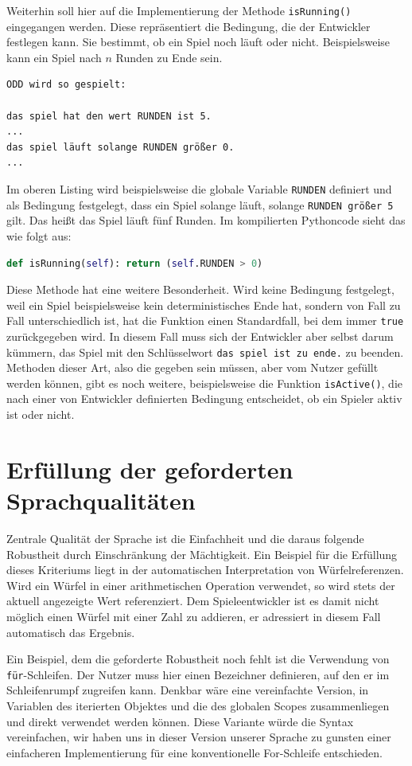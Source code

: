 Weiterhin soll hier auf die Implementierung der Methode \texttt{isRunning()} eingegangen werden. Diese repräsentiert die Bedingung, die der Entwickler festlegen kann. Sie bestimmt, ob ein Spiel noch läuft oder nicht. Beispielsweise kann ein Spiel nach $n$ Runden zu Ende sein.

\begin{lstlisting}[label={lst:ODD}]
ODD wird so gespielt:

das spiel hat den wert RUNDEN ist 5.
...
das spiel läuft solange RUNDEN größer 0.
...
\end{lstlisting}
	Im oberen Listing wird beispielsweise die globale Variable \texttt{RUNDEN} definiert und als Bedingung festgelegt, dass ein Spiel solange läuft, solange \texttt{RUNDEN größer 5} gilt. Das heißt das Spiel läuft fünf Runden. Im kompilierten Pythoncode sieht das wie folgt aus:
\begin{lstlisting}[language=Python]
def isRunning(self): return (self.RUNDEN > 0)
\end{lstlisting}
Diese Methode hat eine weitere Besonderheit. Wird keine Bedingung festgelegt, weil ein Spiel beispielsweise kein deterministisches Ende hat, sondern von Fall zu Fall unterschiedlich ist, hat die Funktion einen Standardfall, bei dem immer \texttt{true} zurückgegeben wird. In diesem Fall muss sich der Entwickler aber selbst darum kümmern, das Spiel mit den Schlüsselwort \texttt{das spiel ist zu ende.} zu beenden. Methoden dieser Art, also die gegeben sein müssen, aber vom Nutzer gefüllt werden können, gibt es noch weitere, beispielsweise die Funktion \texttt{isActive()}, die nach einer von Entwickler definierten Bedingung entscheidet, ob ein Spieler aktiv ist oder nicht.


\section{Erfüllung der geforderten Sprachqualitäten} %
\label{sec:erfullung_der_geforderten_sprachqualitaten}
Zentrale Qualität der Sprache ist die Einfachheit und die daraus folgende Robustheit durch Einschränkung der Mächtigkeit. Ein Beispiel für die Erfüllung dieses Kriteriums liegt in der automatischen Interpretation von Würfelreferenzen. Wird ein Würfel in einer arithmetischen Operation verwendet, so wird stets der aktuell angezeigte Wert referenziert. Dem Spieleentwickler ist es damit nicht möglich einen Würfel mit einer Zahl zu addieren, er adressiert in diesem Fall automatisch das Ergebnis.

Ein Beispiel, dem die geforderte Robustheit noch fehlt ist die Verwendung von \texttt{für}-Schleifen. Der Nutzer muss hier einen Bezeichner definieren, auf den er im Schleifenrumpf zugreifen kann. Denkbar wäre eine vereinfachte Version, in Variablen des iterierten Objektes und die des globalen Scopes zusammenliegen und direkt verwendet werden können. Diese Variante würde die Syntax vereinfachen, wir haben uns in dieser Version unserer Sprache zu gunsten einer einfacheren Implementierung für eine konventionelle For-Schleife entschieden.

